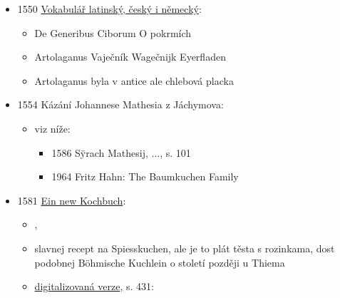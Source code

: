\begin{itemize}
\begin{itemize}
    \begin{itemize}
    \tightlist
    \item
      je zajímavý, že se jmenuje Einen Eierkuchen oder Spiesskuchen zu
      machen, stejně jako u Colera
    \end{itemize}
  \end{itemize}
\item
  1550
  \href{https://vokabular.ujc.cas.cz/nezapojene.aspx?idz=Vokab1550}{Vokabulář
  latinský, český i německý}:

  \begin{itemize}
  \tightlist
  \item
    De Generibus Ciborum \textbar{} O pokrmích
  \item
    Artolaganus \textbar{} Vaječník \textbar{} Wagečnijk \textbar{}
    Eyerfladen
  \item
    Artolaganus byla v antice ale chlebová placka
  \end{itemize}
\item
  1554 Kázání Johannese Mathesia z Jáchymova:

  \begin{itemize}
  \tightlist
  \item
    viz níže:

    \begin{itemize}
    \tightlist
    \item
      1586 Sÿrach Mathesij, ..., s. 101
    \item
      1964 Fritz Hahn: The Baumkuchen Family
    \end{itemize}
  \end{itemize}
\item
  1581 \href{https://cakes.institute/rumpolt.html}{Ein new Kochbuch}:

  \begin{itemize}
  \tightlist
  \item
     , 
  \item
    slavnej recept na Spiesskuchen, ale je to plát těsta s rozinkama,
    dost podobnej Böhmische Kuchlein o století později u Thiema
  \item
    \href{https://digital.staatsbibliothek-berlin.de/werkansicht?PPN=PPN824825497&PHYSID=PHYS_0431&DMDID=DMDLOG_0023}{digitalizovaná
    verze}, s. 431:


\end{itemize}
\end{itemize}
